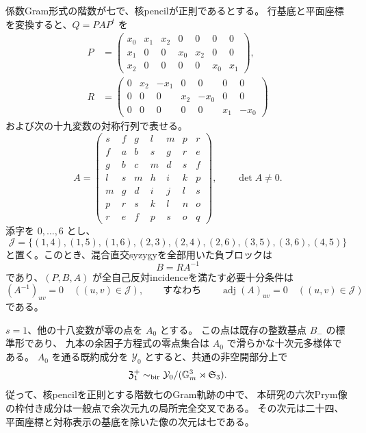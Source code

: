 \begin{theorem}[九本の余因子方程式]
\label{thm:sextic-normal-form-v28}
係数Gram形式の階数が七で、核pencilが正則であるとする。
行基底と平面座標を変換すると、$Q=PAP^t$ を
\begin{equation}\label{eq:canonical-P-R-v28}
\begin{split}
 P&=\begin{pmatrix}
 x_0&x_1&x_2&0&0&0&0\\
 x_1&0&0&x_0&x_2&0&0\\
 x_2&0&0&0&0&x_0&x_1
 \end{pmatrix},\\[2pt]
 R&=\begin{pmatrix}
 0&x_2&-x_1&0&0&0&0\\
 0&0&0&x_2&-x_0&0&0\\
 0&0&0&0&0&x_1&-x_0
 \end{pmatrix}
\end{split}
\end{equation}
および次の十九変数の対称行列で表せる。
\begin{equation}\label{eq:A-nineteen-v28}
 A=\begin{pmatrix}
 s&f&g&l&m&p&r\\
 f&a&b&s&g&r&e\\
 g&b&c&m&d&s&f\\
 l&s&m&h&i&k&p\\
 m&g&d&i&j&l&s\\
 p&r&s&k&l&n&o\\
 r&e&f&p&s&o&q
 \end{pmatrix},\qquad \det A\ne0.
\end{equation}
添字を $0,\ldots,6$ とし、
\[
 \mathcal J=\{(1,4),(1,5),(1,6),(2,3),(2,4),(2,6),
                    (3,5),(3,6),(4,5)\}
\]
と置く。このとき、混合直交syzygyを全部用いた負ブロックは
\[
 B=RA^{-1}
\]
であり、$(P,B,A)$ が全自己反対incidenceを満たす必要十分条件は
\begin{equation}\label{eq:nine-cofactor-equations-v28}
 (A^{-1})_{uv}=0\quad ((u,v)\in\mathcal J),
 \qquad\text{すなわち}\qquad
 \operatorname{adj}(A)_{uv}=0\quad ((u,v)\in\mathcal J)
\end{equation}
である。

$s=1$、他の十八変数が零の点を $A_0$ とする。
この点は既存の整数基点 $B_-$ の標準形であり、
九本の余因子方程式の零点集合は $A_0$ で滑らかな十次元多様体である。
$A_0$ を通る既約成分を $\mathcal Y_0$ とすると、共通の非空開部分上で
\begin{equation}\label{eq:normal-form-quotient-v28}
 \mathfrak Z_1^+\sim_{\rm bir}
 \mathcal Y_0/(\mathbb G_m^3\rtimes\mathfrak S_3).
\end{equation}
従って、核pencilを正則とする階数七のGram軌跡の中で、
本研究の六次Prym像の枠付き成分は一般点で余次元九の局所完全交叉である。
その次元は二十四、平面座標と対称表示の基底を除いた像の次元は七である。
\end{theorem}

